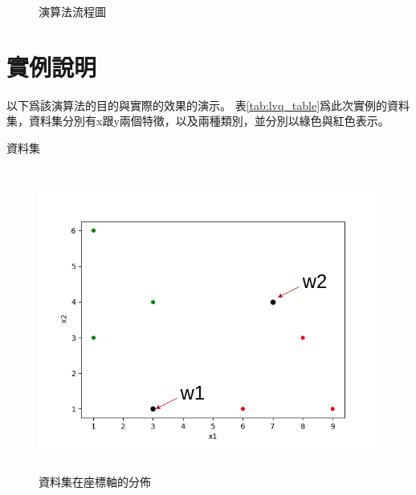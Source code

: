 

\begin{figure}[H]
	\centering
	
	\caption{演算法流程圖}
	\label{fig:AlogrithmWorkflow}
\end{figure}




\section{實例說明}

以下爲該演算法的目的與實際的效果的演示。
表\ref{tab:lvq_table}爲此次實例的資料集，資料集分別有x跟y兩個特徵，以及兩種類別，並分別以綠色與紅色表示。


\begin{table}[h!]
	\centering
	\caption{資料集}
	\label{tab:lvq_table}
	
\end{table}


\begin{figure}[h!]
	\centering
	\includegraphics[height=10cm]{./pic/2nSRVeud.png}
	\caption{資料集在座標軸的分佈}
	\label{fig:DatasetInAxis}
\end{figure}

